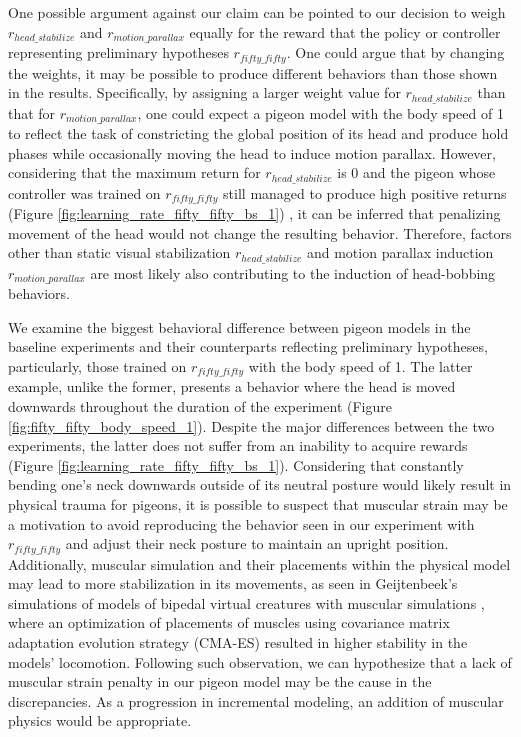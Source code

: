   One possible argument against our claim can be pointed to our decision to weigh $r_{head\_stabilize}$ and $r_{motion\_parallax}$ equally for the reward that the policy or controller representing preliminary hypotheses $r_{fifty\_fifty}$. One could argue that by changing the weights, it may be possible to produce different behaviors than those shown in the results.
  Specifically, by assigning a larger weight value for $r_{head\_stabilize}$ than that for $r_{motion\_parallax}$, one could expect a pigeon model with the body speed of 1 to reflect the task of constricting the global position of its head and produce hold phases while occasionally moving the head to induce motion parallax.
  However, considering that the maximum return for $r_{head\_stabilize}$ is 0 and the pigeon whose controller was trained on $r_{fifty\_fifty}$ still managed to produce high positive returns (Figure \ref{fig:learning_rate_fifty_fifty_bs_1}) , it can be inferred that penalizing movement of the head would not change the resulting behavior.
  Therefore, factors other than static visual stabilization $r_{head\_stabilize}$ and motion parallax induction $r_{motion\_parallax}$ are most likely also contributing to the induction of head-bobbing behaviors.

  We examine the biggest behavioral difference between pigeon models in the baseline experiments and their counterparts reflecting preliminary hypotheses, particularly, those trained on $r_{fifty\_fifty}$ with the body speed of 1.
  The latter example, unlike the former, presents a behavior where the head is moved downwards throughout the duration of the experiment (Figure \ref{fig:fifty_fifty_body_speed_1}).
  Despite the major differences between the two experiments, the latter does not suffer from an inability to acquire rewards (Figure \ref{fig:learning_rate_fifty_fifty_bs_1}).
  Considering that constantly bending one's neck downwards outside of its neutral posture would likely result in physical trauma for pigeons, it is possible to suspect that muscular strain may be a motivation to avoid reproducing the behavior seen in our experiment with $r_{fifty\_fifty}$ and adjust their neck posture to maintain an upright position.
  Additionally, muscular simulation and their placements within the physical model may lead to more stabilization in its movements, as seen in Geijtenbeek's simulations of models of bipedal virtual creatures with muscular simulations \cite{geijtenbeek2013flexible}, where an optimization of placements of muscles using covariance matrix adaptation evolution strategy (CMA-ES) resulted in higher stability in the models' locomotion.
  Following such observation, we can hypothesize that a lack of muscular strain penalty in our pigeon model may be the cause in the discrepancies. As a progression in incremental modeling, an addition of muscular physics would be appropriate.


